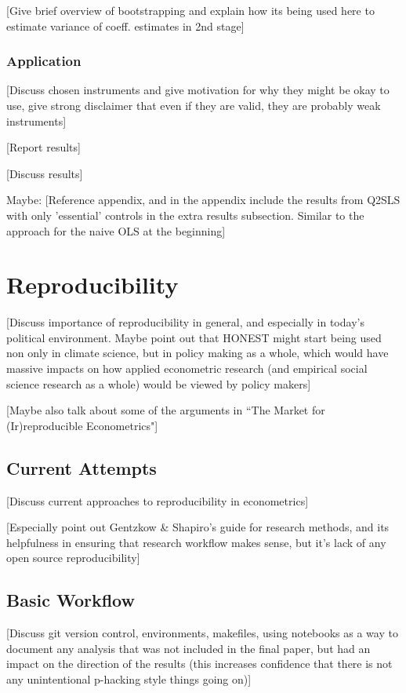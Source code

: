 \documentclass[12pt]{article}
\begin{document}
\textcolor{BrickRed}{[Give brief overview of bootstrapping and explain how its being used here to estimate variance of coeff. estimates in 2nd stage]}

\subsubsection{Application}
\textcolor{BrickRed}{[Discuss chosen instruments and give motivation for why they might be okay to use, give strong disclaimer that even if they are valid, they are probably weak instruments]}

\textcolor{BrickRed}{[Report results]}

\textcolor{BrickRed}{[Discuss results]}

Maybe: \textcolor{BrickRed}{[Reference appendix, and in the appendix include the results from Q2SLS with only 'essential' controls in the extra results subsection. Similar to the approach for the naive OLS at the beginning]}


\newpage
\section{Reproducibility}
\textcolor{BrickRed}{[Discuss importance of reproducibility in general, and especially in today's political environment. Maybe point out that HONEST might start being used non only in climate science, but in policy making as a whole, which would have massive impacts on how applied econometric research (and empirical social science research as a whole) would be viewed by policy makers]}

\textcolor{BrickRed}{[Maybe also talk about some of the arguments in ``The Market for (Ir)reproducible Econometrics"]}

\subsection{Current Attempts}
\textcolor{BrickRed}{[Discuss current approaches to reproducibility in econometrics]}

\textcolor{BrickRed}{[Especially point out Gentzkow \& Shapiro's guide for research methods, and its helpfulness in ensuring that research workflow makes sense, but it's lack of any open source reproducibility]}

\subsection{Basic Workflow}
\textcolor{BrickRed}{[Discuss git version control, environments, makefiles, using notebooks as a way to document any analysis that was not included in the final paper, but had an impact on the direction of the results (this increases confidence that there is not any unintentional p-hacking style things going on)]}
\end{document}
